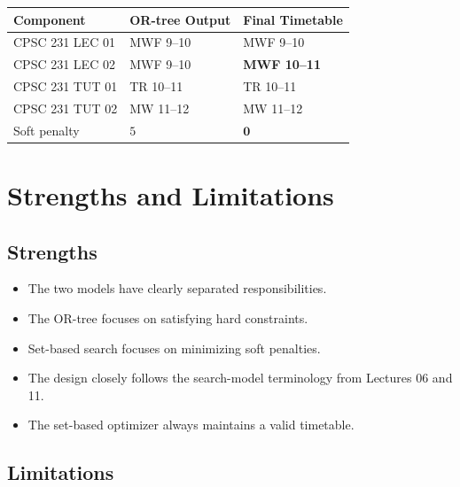 \documentclass[11pt,letterpaper]{article}
\begin{document}
\begin{tabularx}{\linewidth}{@{}lXX@{}}
\toprule
\textbf{Component} &
\textbf{OR-tree Output} &
\textbf{Final Timetable}\\
\midrule
CPSC 231 LEC 01 &
MWF 9--10 &
MWF 9--10\\

CPSC 231 LEC 02 &
MWF 9--10 &
\textbf{MWF 10--11}\\

CPSC 231 TUT 01 &
TR 10--11 &
TR 10--11\\

CPSC 231 TUT 02 &
MW 11--12 &
MW 11--12\\
\midrule
Soft penalty &
$5$ &
$\mathbf{0}$\\
\bottomrule
\end{tabularx}

\section{Strengths and Limitations}

\subsection{Strengths}

\begin{itemize}
    \item The two models have clearly
    separated responsibilities.

    \item The OR-tree focuses on satisfying
    hard constraints.

    \item Set-based search focuses on
    minimizing soft penalties.

    \item The design closely follows the
    search-model terminology from
    Lectures 06 and 11.

    \item The set-based optimizer always
    maintains a valid timetable.
\end{itemize}

\subsection{Limitations}
\end{document}
